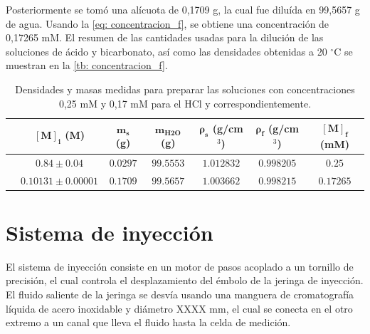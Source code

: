 	Posteriormente se tom\'o una al\'icuota de 0,1709 g, la cual fue dilu\'ida en 99,5657 g de agua. Usando la \autoref{eq: concentracion_f}, se obtiene una concentraci\'on de 0,17265 mM. El resumen de las cantidades usadas para la diluci\'on de las soluciones de \'acido y bicarbonato, as\'i como las densidades obtenidas a 20 $^\circ$C se muestran en la \autoref{tb: concentracion_f}.
	\begin{table}[h]
		\centering
		\caption{Densidades y masas medidas para preparar las soluciones con concentraciones 0,25 mM y 0,17 mM para el HCl y  correspondientemente.}
		\small
		\begin{tabular}{c|cccccc}
			\hline
			& $\mathbf{[M]_i}$ (M) & $\mathbf{m_s}$ (g) & $\mathbf{m_{\text{H2O}}}$ (g) & $\bm{\rho_s}$ (g/cm$^3$)& $\bm{\rho_f}$ (g/cm$^3$) & $\mathbf{[M]_f}$ (mM) \\
			\hline
			\textbf{\ce{HCl}} & $0.84 \pm 0.04$ & $0.0297$ & $99.5553$ & $1.012832$ & $0.998205$ & $0.25$ \\
			\textbf{\ce{KHCO3}} & $0.10131\pm 0.00001$ & $0.1709$ & $99.5657$ & $1.003662$ & $0.998215$ & $0.17265$ \\
			\hline
		\end{tabular}
		\label{tb: concentracion_f}
	\end{table}
	
\section{Sistema de inyecci\'on}
	El sistema de inyecci\'on consiste en un motor de pasos acoplado a un tornillo de precisión, el cual controla el desplazamiento del émbolo de la jeringa de inyección. El fluido saliente de la jeringa se desvía usando una manguera de cromatografía líquida de acero inoxidable y diámetro XXXX mm, el cual se conecta en el otro extremo a un canal que lleva el fluido hasta la celda de medición.
	
